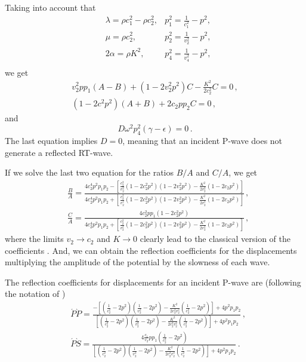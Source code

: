 \documentclass[12pt]{article}
\begin{document}
Taking into account that
\begin{align*}
&\lambda = \rho c_1^2 - \rho c_2^2, &p_1^2 = \frac{1}{c_1^2} - p^2,\\
&\mu = \rho c_2^2 , &p_2^2 = \frac{1}{v_2^2} - p^2,\\
&2\alpha = \rho K^2, &p_4^2 = \frac{1}{v_4^2} - p^2,\\
\end{align*}
we get
\begin{align*}
v_2^2 p p_1 (A - B) + (1 - 2v_2^2 p^2)C - \frac{K^2}{2c_2^2}C = 0\, ,\\
(1 - 2c^2p^2)(A + B) + 2c_2p p_2 C = 0\, ,
\end{align*}
and
\[D\omega^2 p_4^2 (\gamma - \epsilon) = 0\, .\]
The last equation implies \(D = 0\), meaning that an incident P-wave does not generate a reflected RT-wave.

If we solve the last two equation for the ratios \(B/A\) and \(C/A\), we get
\begin{align*}
&\frac{B}{A} = \frac{4c_2^4 p^2 p_1 p_2 - \left[\frac{c_2^2}{v_2^2}(1 - 2c_2^2 p^2)(1 - 2v_2^2 p^2) - \frac{K^2}{2v_2^2}(1 - 2c_2 p^2)\right]} {4c_2^4 p^2 p_1 p_2 + \left[\frac{c_2^2}{v_2^2}(1 - 2c_2^2 p^2)(1 - 2v_2^2 p^2) - \frac{K^2}{2v_2^2}(1 - 2c_2 p^2)\right]}\, ,\\
&\frac{C}{A} = \frac{4c_2^2 p p_1 (1 - 2c_2^2 p^2)} {4c_2^4 p^2 p_1 p_2 + \left[\frac{c_2^2}{v_2^2}(1 - 2c_2^2 p^2)(1 - 2v_2^2 p^2) - \frac{K^2}{2v_2^2}(1 - 2c_2 p^2)\right]}\, ,
\end{align*}
where the limits \(v_2 \rightarrow c_2\) and \(K \rightarrow 0\) clearly lead to the classical version of the coefficients \citep{AkiAndRichards2002}. And, we can obtain the reflection coefficients for the displacements multiplying the amplitude of the potential by the slowness of each wave.

The reflection coefficients for displacements for an incident P-wave are (following the notation of \citep{AkiAndRichards2002})
\begin{align}
&\acute{P}\grave{P} = \frac{-\left[\left(\frac{1}{c_2^2} - 2 p^2\right)\left(\frac{1}{v_2^2} - 2 p^2\right) - \frac{K^2}{2 c_2^2 v_2^2}\left(\frac{1}{c_2^2} - 2 p^2\right)\right] + 4 p^2 p_1 p_2} {\left[\left(\frac{1}{c_2^2} - 2 p^2\right)\left(\frac{1}{v_2^2} - 2 p^2\right) - \frac{K^2}{2 c_2^2 v_2^2}\left(\frac{1}{c_2^2} - 2 p^2\right)\right] + 4 p^2 p_1 p_2}\, ,\\
&\acute{P}\grave{S} = \frac{4 \frac{c_1}{v_2} p p_1\left(\frac{1}{c_2^2} - 2 p^2\right)} {\left[\left(\frac{1}{c_2^2} - 2 p^2\right)\left(\frac{1}{v_2^2} - 2 p^2\right) - \frac{K^2}{2 c_2^2 v_2^2}\left(\frac{1}{c_2^2} - 2 p^2\right)\right] + 4 p^2 p_1 p_2}\, .\\
\end{align}
\end{document}
